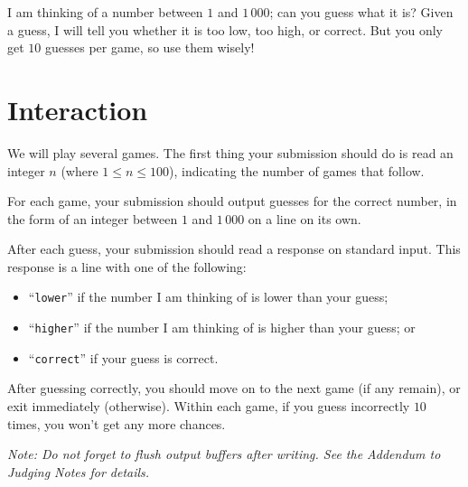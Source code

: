 
I am thinking of a number between $1$ and $1\,000$; can you guess what
it is?  Given a guess, I will tell you whether it is too
low, too high, or correct.  But you only get $10$ guesses per game, so
use them wisely!

\vspace{-0.1in}

\section*{Interaction}

We will play several games. The first thing your submission should do is read an
integer $n$ (where $1\le n\le 100$), indicating the number of games that follow.

For each game, your submission should output guesses for the correct number, in
the form of an integer between $1$ and $1\,000$ on a line on its own.

After each guess, your submission should read a response on standard input.
This response is a line with one of the following:

\vspace{-8pt}
\begin{itemize}
\itemsep=-2pt
\item ``\texttt{lower}'' if the number I am thinking of is lower than your guess;
\item ``\texttt{higher}'' if the number I am thinking of is higher than your guess; or
\item ``\texttt{correct}'' if your guess is correct.
\end{itemize}
\vspace{-2pt}

After guessing correctly, you should move on to the next
game (if any remain), or exit immediately (otherwise).
Within each game, if you guess incorrectly $10$ times, you won't
get any more chances.

\emph{Note: Do not forget to flush output buffers after writing. See the Addendum to Judging Notes for details.}
